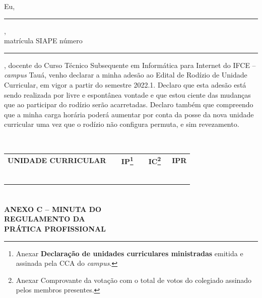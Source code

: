 \documentclass[
	12pt,				%
	openright,			%
	twoside,			%
	a4paper,			%
	chapter=TITLE,		%
	english,			%
	french,				%
	spanish,			%
	brazil,				%
	]{abntex2}
\begin{document}
\begin{anexos}
{\DoubleSpacing

Eu, \rule{.87\linewidth}{0.2mm}, \\matrícula SIAPE número
\rule{.2\linewidth}{0.2mm}, docente  do Curso Técnico Subsequente em Informática
para Internet do IFCE -- \textit{campus} Tauá,  venho declarar a minha adesão ao
Edital de Rodízio de Unidade Curricular, em vigor a partir do semestre 2022.1. Declaro
que esta adesão está sendo realizada por livre e espontânea vontade e que estou
ciente das mudanças que ao participar do rodízio serão acarretadas. Declaro
também que  compreendo que a minha carga horária poderá aumentar por conta da
posse da nova unidade curricular uma vez que o rodízio não configura permuta, e sim
revezamento.} \\


\noindent\begin{tabularx}{\linewidth}{|X | X |  X | X|}
\hline
\multicolumn{1}{|p{.7\textwidth}|}{\cellcolor{gray!20}\bfseries{UNIDADE CURRICULAR}} & \cellcolor{gray!20}\bfseries{~~IP\footnote{Anexar \textbf{Declaração de unidades curriculares ministradas} emitida e assinada pela CCA do \textit{campus}.}} & \cellcolor{gray!20}\bfseries{~~IC\footnote{Anexar Comprovante da votação com o total de votos do colegiado assinado pelos membros presentes.}} & \cellcolor{gray!20}\bfseries{~IPR} \\
& & & \\
\hline

& & & \\
\hline


& & & \\
\hline

& & & \\
\hline


& & & \\
\hline

& & & \\
\hline

 
\end{tabularx}

\begin{assinaturas}
	\qquad
\end{assinaturas}


\chapter*{}	\label{anexoe}
{

    \begin{center}
    \begin{vplace}
        \bfseries{
            \vspace{-2em}
            \fontsize{1cm}{1.5cm}\selectfont
    	    \textbf{ANEXO C -- MINUTA DO } 
	        	   \\
	    \textbf{REGULAMENTO DA}
	    \\
	    \vspace{1em}
	    \textbf{PRÁTICA PROFISSIONAL}
        }
    \end{vplace}


\end{center}}
\end{anexos}
\end{document}
